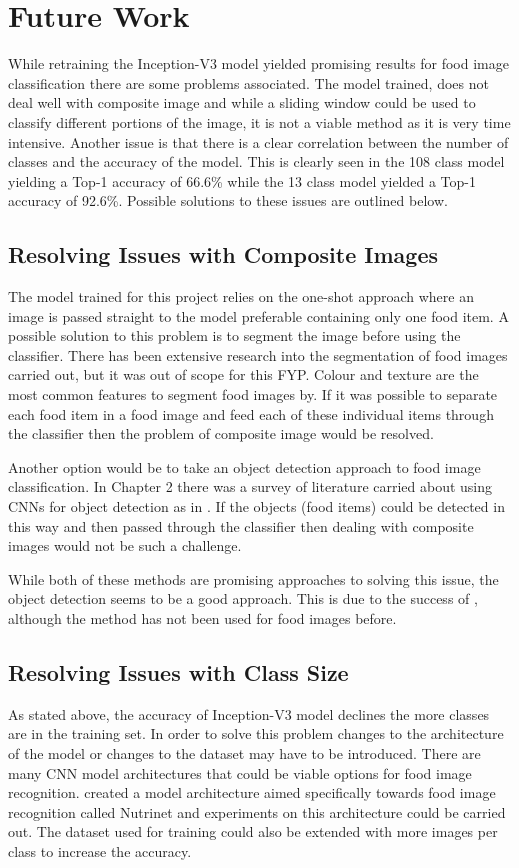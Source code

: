

\section{Future Work}
While retraining the Inception-V3 model yielded promising results for food image classification there are some problems associated.
The model trained, does not deal well with composite image and while a sliding window could be used to classify different portions of the image, it is not a viable method as it is very time intensive.
Another issue is that there is a clear correlation between the number of classes and the accuracy of the model.
This is clearly seen in the 108 class model yielding a Top-1 accuracy of 66.6\% while the 13 class model yielded a Top-1 accuracy of 92.6\%.
Possible solutions to these issues are outlined below.

\tocless\subsection{Resolving Issues with Composite Images}
The model trained for this project relies on the one-shot approach where an image is passed straight to the model preferable containing only one food item.
A possible solution to this problem is to segment the image before using the classifier.
There has been extensive research into the segmentation of food images carried out, but it was out of scope for this FYP.
Colour and texture are the most common features to segment food images by.
If it was possible to separate each food item in a food image and feed each of these individual items through the classifier then the problem of composite image would be resolved.

Another option would be to take an object detection approach to food image classification.
In Chapter 2 there was a survey of literature carried about
using CNNs for object detection as in \parencite{maskRcnn}.
If the objects (food items) could be detected in this way and then passed through the classifier then dealing with composite images would not be such a challenge.

While both of these methods are promising approaches to solving this issue, the object detection seems to be a good approach. This is due to the success of \parencite{maskRcnn}, although the method has not been used for food images before.

\tocless\subsection{Resolving Issues with Class Size}
As stated above, the accuracy of Inception-V3 model declines the more classes are in the training set.
In order to solve this problem changes to the architecture of the model or
changes to the dataset may have to be introduced.
There are many CNN model architectures that could be viable options for food image recognition.
\parencite{nutrinet} created a model architecture aimed specifically towards food image recognition called Nutrinet and experiments on this architecture could be carried out.
The dataset used for training could also be extended with more images per class to increase the accuracy.
